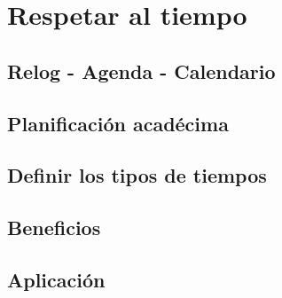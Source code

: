 \chapter{Respetar al tiempo}
\section{Relog - Agenda - Calendario}
\section{Planificación acad\'ecima}
\section{Definir los tipos de tiempos}
\section{Beneficios}
\section{Aplicaci\'on}
